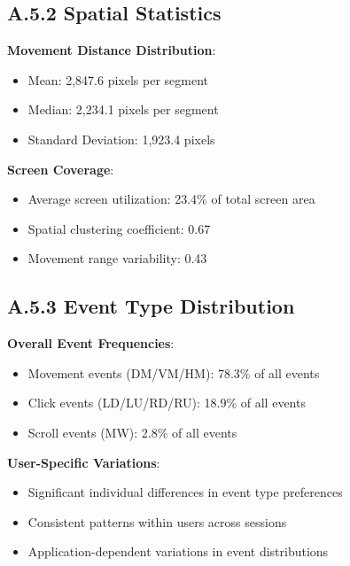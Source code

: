 \documentclass[
  12pt,
  a4paper,
]{report}
\providecommand{\tightlist}{%
  \setlength{\itemsep}{0pt}\setlength{\parskip}{0pt}}
\begin{document}
\subsection{A.5.2 Spatial Statistics}\label{a.5.2-spatial-statistics}

\textbf{Movement Distance Distribution}:

\begin{itemize}
\tightlist
\item
  Mean: 2,847.6 pixels per segment
\item
  Median: 2,234.1 pixels per segment
\item
  Standard Deviation: 1,923.4 pixels
\end{itemize}

\textbf{Screen Coverage}:

\begin{itemize}
\tightlist
\item
  Average screen utilization: 23.4\% of total screen area
\item
  Spatial clustering coefficient: 0.67
\item
  Movement range variability: 0.43
\end{itemize}

\subsection{A.5.3 Event Type
Distribution}\label{a.5.3-event-type-distribution}

\textbf{Overall Event Frequencies}:

\begin{itemize}
\tightlist
\item
  Movement events (DM/VM/HM): 78.3\% of all events
\item
  Click events (LD/LU/RD/RU): 18.9\% of all events
\item
  Scroll events (MW): 2.8\% of all events
\end{itemize}

\textbf{User-Specific Variations}:

\begin{itemize}
\tightlist
\item
  Significant individual differences in event type preferences
\item
  Consistent patterns within users across sessions
\item
  Application-dependent variations in event distributions
\end{itemize}
\end{document}
